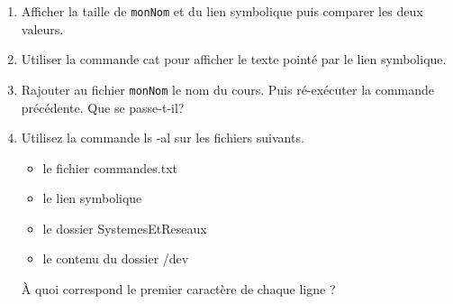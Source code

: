 \documentclass[a4paper,11pt]{exam}
\begin{document}
{\begin{enumerate}
        \item Afficher la taille de \texttt{monNom} et du lien symbolique puis comparer les deux valeurs.
		
        \item Utiliser la commande cat pour afficher le texte pointé par le lien symbolique.
		
		\item Rajouter au fichier \texttt{monNom} le nom du cours. Puis ré-exécuter la commande précédente. Que se passe-t-il?
		
		\item Utilisez la commande ls -al sur les fichiers suivants.
		\begin{itemize}
			\item le fichier commandes.txt
			\item le lien symbolique
			\item le dossier SystemesEtReseaux
			\item le contenu du dossier /dev
		\end{itemize}
		À quoi correspond le premier caractère de chaque ligne ?
	\end{enumerate}
} 

\end{document}

